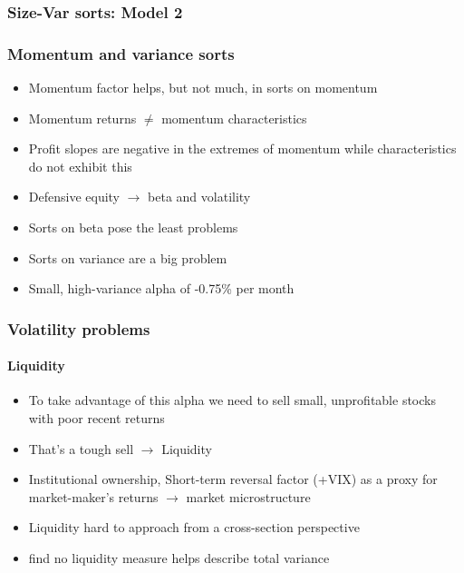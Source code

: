 \documentclass[notes]{beamer}  %
\begin{document}

\begin{frame}
  \frametitle{Size-Var sorts: Model 2}
  \begin{center}
  \resizebox*{!}{\dimexpr\textheight-1.3cm\relax}{
    
    }
  \end{center}
\end{frame}

\begin{frame} \frametitle{Momentum and variance sorts}
  \begin{itemize}
    \item Momentum factor helps, but not much, in sorts on momentum
    \item Momentum returns $\neq$ momentum characteristics
    \item Profit slopes are negative in the extremes of momentum while
    characteristics do not exhibit this
    \item Defensive equity $\rightarrow$ beta and volatility
    \parencite{novy2014understanding}
    \item Sorts on beta pose the least problems
    \item Sorts on variance are a big problem
    \item Small, high-variance alpha of -0.75\% per month
  \end{itemize}
\end{frame}

\begin{frame} \frametitle{Volatility problems} \framesubtitle{Liquidity}
  \begin{itemize}
    \item To take advantage of this alpha we need to sell small,
    unprofitable stocks with poor recent returns
    \item That's a tough sell $\rightarrow$ Liquidity
    \parencite{nagel2005short, nagel2012evaporating}
    \item Institutional ownership, Short-term reversal factor (+VIX) as a proxy
    for market-maker's returns $\rightarrow$ market microstructure
    \item Liquidity hard to approach from a cross-section perspective
    \item \textcite{ang2006cross} find no liquidity measure helps describe
    total variance
  \end{itemize}
\end{frame}
\end{document}
